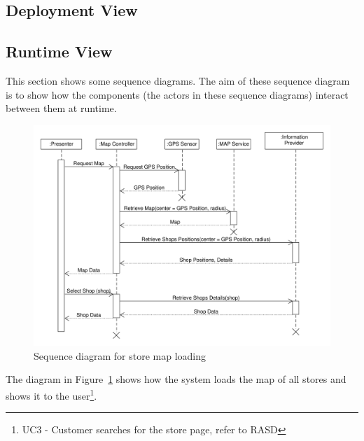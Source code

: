\subsection{Deployment View}
\clearpage
\subsection{Runtime View}
This section shows some sequence diagrams. The aim of these sequence diagram is to show how the components (the actors in these sequence diagrams) interact between them at runtime. 
\begin{figure}[H]
    \includegraphics[width=\textwidth]{Images/UML_user_map_sequence.pdf}
    \caption{\label{fig:UML_user_map_sequence}Sequence diagram for store map loading}
\end{figure}
The diagram in Figure~\ref{fig:UML_user_map_sequence} shows how the system loads the map of all stores and shows it to the user\footnote{UC3 - Customer searches for the store page, refer to RASD}.

